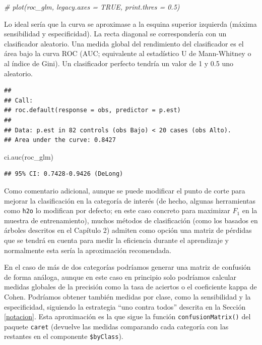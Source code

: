 \documentclass[
  spanish,
]{book}
\newenvironment{Shaded}{\begin{snugshade}}{\end{snugshade}}
\newcommand{\CommentTok}[1]{\textcolor[rgb]{0.56,0.35,0.01}{\textit{#1}}}
\newcommand{\FunctionTok}[1]{\textcolor[rgb]{0.00,0.00,0.00}{#1}}
\newcommand{\NormalTok}[1]{#1}
\theoremstyle{break}
\theoremstyle{definition}
\theoremstyle{definition}
\theoremstyle{definition}
\theoremstyle{definition}
\theoremstyle{remark}
\begin{document}
\begin{Shaded}
\begin{Highlighting}[]
\CommentTok{\# plot(roc\_glm, legacy.axes = TRUE, print.thres = 0.5)}
\end{Highlighting}
\end{Shaded}

Lo ideal sería que la curva se aproximase a la esquina superior izquierda (máxima sensibilidad y especificidad).
La recta diagonal se correspondería con un clasificador aleatorio.
Una medida global del rendimiento del clasificador es el área bajo la curva ROC (AUC; equivalente al estadístico U de Mann-Whitney o al índice de Gini).
Un clasificador perfecto tendría un valor de 1 y 0.5 uno aleatorio.

\begin{Shaded}
\end{Shaded}

\begin{verbatim}
## 
## Call:
## roc.default(response = obs, predictor = p.est)
## 
## Data: p.est in 82 controls (obs Bajo) < 20 cases (obs Alto).
## Area under the curve: 0.8427
\end{verbatim}

\begin{Shaded}
\begin{Highlighting}[]
\FunctionTok{ci.auc}\NormalTok{(roc\_glm)}
\end{Highlighting}
\end{Shaded}

\begin{verbatim}
## 95% CI: 0.7428-0.9426 (DeLong)
\end{verbatim}

Como comentario adicional, aunque se puede modificar el punto de corte para mejorar la clasificación en la categoría de interés (de hecho, algunas herramientas como \texttt{h2o} lo modifican por defecto; en este caso concreto para maximizar \(F_1\) en la muestra de entrenamiento), muchos métodos de clasificación (como los basados en árboles descritos en el Capítulo 2) admiten como opción una matriz de pérdidas que se tendrá en cuenta para medir la eficiencia durante el aprendizaje y normalmente esta sería la aproximación recomendada.

En el caso de más de dos categorías podríamos generar una matriz de confusión de forma análoga,
aunque en este caso en principio solo podríamos calcular medidas globales de la precisión como la tasa de aciertos o el coeficiente kappa de Cohen.
Podríamos obtener también medidas por clase, como la sensibilidad y la especificidad, siguiendo la estrategia ``uno contra todos'' descrita en la Sección \ref{notacion}.
Esta aproximación es la que sigue la función \texttt{confusionMatrix()} del paquete \texttt{caret} (devuelve las medidas comparando cada categoría con las restantes en el componente \texttt{\$byClass}).
\end{document}
